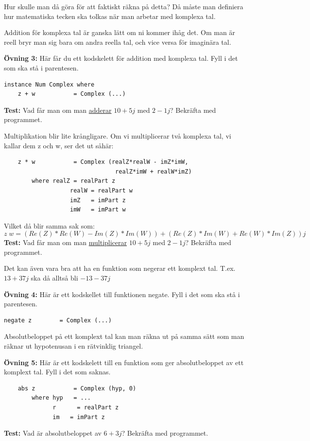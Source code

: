 \documentclass{article}
\begin{document}
Hur skulle man då göra för att faktiskt räkna på detta?
Då måste man definiera hur matematiska tecken ska tolkas när man arbetar med
komplexa tal.

Addition för komplexa tal är ganska lätt om ni kommer ihåg det.
Om man är reell bryr man sig bara om andra reella tal, och vice versa för
imaginära tal.

\textbf{Övning 3:} Här får du ett kodskelett för addition med komplexa tal.
Fyll i det som ska stå i parentesen.
\begin{verbatim}
instance Num Complex where
    z + w           = Complex (...)
\end{verbatim}
\textbf{Test:} Vad får man om man \underline{adderar} $10 + 5j$ med $2 -1j$?
Bekräfta med programmet.

Multiplikation blir lite krångligare.
Om vi multiplicerar två komplexa tal, vi kallar dem z och w, ser det ut såhär:
\begin{verbatim}
    z * w           = Complex (realZ*realW - imZ*imW,
                                realZ*imW + realW*imZ)
        where realZ = realPart z
                   realW = realPart w
                   imZ   = imPart z
                   imW   = imPart w
\end{verbatim}
Vilket då blir samma sak som:
$$z \; w = (Re(Z) * Re(W) - Im(Z)*Im(W)) + (Re(Z)*Im(W) + Re(W)*Im(Z))j$$
\textbf{Test:} Vad får man om man \underline{multiplicerar} $10 + 5j$ med $2 -1j$?
Bekräfta med programmet.

Det kan även vara bra att ha en funktion som negerar ett komplext tal.
T.ex. $13+37j$ ska då alltså bli $-13-37j$

\textbf{Övning 4:} Här är ett kodskellet till funktionen negate.
Fyll i det som ska stå i parentesen.
\begin{verbatim}
negate z        = Complex (...)
\end{verbatim}
Absolutbeloppet på ett komplext tal kan man räkna ut på samma sätt som man
räknar ut hypotenusan i en rätvinklig triangel.

\textbf{Övning 5:} Här är ett kodskelett till en funktion som ger absolutbeloppet
av ett komplext tal. Fyll i det som saknas.
\begin{verbatim}
    abs z           = Complex (hyp, 0)
        where hyp   = ...
              r      = realPart z
              im   = imPart z
\end{verbatim}
\textbf{Test:} Vad är absolutbeloppet av $6 + 3j$? Bekräfta med programmet.
\end{document}
